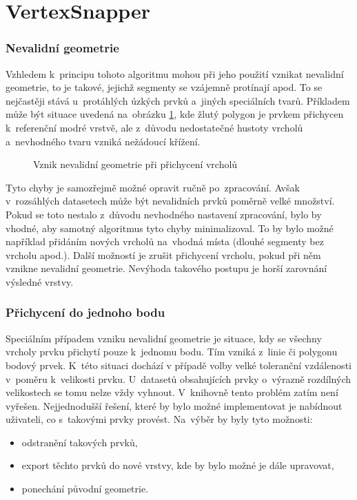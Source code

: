 \section{VertexSnapper}
\label{problemy-vs}

\subsubsection{Nevalidní geometrie}
Vzhledem k~principu tohoto algoritmu mohou při jeho použití vznikat nevalidní 
geometrie, to je takové, jejichž segmenty se vzájemně protínají apod. 
To se nejčastěji stává u~protáhlých úzkých prvků a~jiných speciálních tvarů. 
Příkladem může být situace uvedená na~obrázku \ref{fig:vs-nevalidni}, 
kde žlutý polygon je prvkem přichycen k~referenční modré vrstvě, 
ale z~důvodu nedostatečné hustoty vrcholů a~nevhodného tvaru vzniká nežádoucí 
křížení.

\label{vsinvalid}
  \begin{figure}[hbt]
    \centering
      
      \caption{Vznik nevalidní geometrie při přichycení vrcholů}
      \label{fig:vs-nevalidni}
  \end{figure} 

Tyto chyby je samozřejmě možné opravit ručně po~zpracování. Avšak
v~rozsáhlých datasetech může být nevalidních prvků poměrně velké množství.
Pokud se toto nestalo z~důvodu nevhodného nastavení zpracování, bylo by 
vhodné, aby samotný algoritmus tyto chyby minimalizoval. To by bylo možné 
například přidáním nových vrcholů na~vhodná místa (dlouhé segmenty bez vrcholu
apod.). Další možností je zrušit přichycení vrcholu, pokud při něm vznikne
nevalidní geometrie. Nevýhoda takového postupu je horší zarovnání výsledné 
vrstvy. 

\subsubsection{Přichycení do jednoho bodu}
Speciálním případem vzniku nevalidní geometrie je situace, kdy se všechny 
vrcholy prvku přichytí pouze k~jednomu bodu. Tím vzniká z~linie či polygonu
bodový prvek. K~této situaci dochází v případě volby velké toleranční 
vzdálenosti v~poměru k~velikosti prvku. U~datasetů obsahujících prvky
o~výrazně rozdílných velikostech se tomu nelze vždy vyhnout. V~knihovně
 tento problém zatím není vyřešen. Nejjednodušší řešení, které
by bylo možné implementovat je nabídnout uživateli, co s~takovými prvky provést.
Na~výběr by byly tyto možnosti:
\begin{itemize}
 \item odstranění takových prvků,
 \item export těchto prvků do nové vrstvy, kde by bylo možné je dále upravovat,
 \item ponechání původní geometrie. 
\end{itemize}


